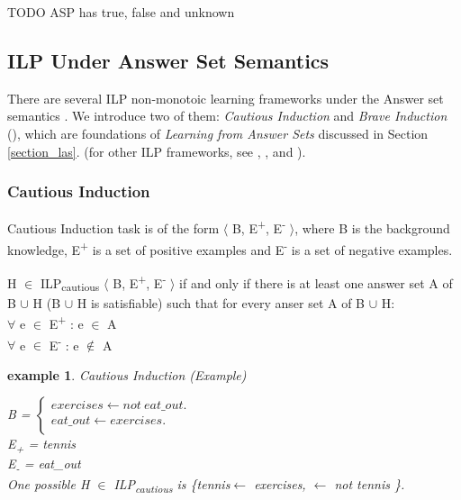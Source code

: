 \documentclass[12pt,twoside]{report}
\newtheorem{examp}{example}[section]
\begin{document}
TODO ASP has true, false and unknown

\subsection{ILP Under Answer Set Semantics}

There are several ILP non-monotoic learning frameworks under the Answer set semantics . We introduce two of them: \textit{Cautious Induction} and \textit{Brave Induction} (\cite{Sakama2009}), which are foundations of \textit{Learning from Answer Sets} discussed in Section \ref{section_las}.  (for other ILP frameworks, see \cite{Otero2001}, \cite{Inoue2014}, \cite{Corapi2012} and \cite{DeRaedt1997}).
\subsubsection{Cautious Induction}
Cautious Induction task is of the form $\langle$ B, E\textsuperscript{+}, E\textsuperscript{-} $\rangle$, where B is the background knowledge, E\textsuperscript{+} is a set of positive examples and E\textsuperscript{-} is a set of negative examples.

 H $\in$ ILP\textsubscript{cautious} $\langle$ B, E\textsuperscript{+}, E\textsuperscript{-} $\rangle$ if and only if  there is at least one answer set A of B $\cup$ H (B $\cup$ H is satisfiable) such that for every anser set A of B $\cup$ H: \\
$\forall$ e $\in$ E\textsuperscript{+} : e $\in$ A \\
$\forall$ e $\in$ E\textsuperscript{-} : e $\notin$ A \\

\begin{examp} \normalfont Cautious Induction (Example)

B = $\begin{cases}
	exercises  \leftarrow not \ eat\_out. \\
	eat\_out \leftarrow exercises. \\
      \end{cases}$ \\
E\textsubscript{+} = tennis \\
E\textsubscript{-} = eat\_out \\
One possible  H $\in$ ILP\textsubscript{cautious} is \{tennis$ \leftarrow$ exercises, $\leftarrow$ not tennis \}.
\end{examp}
\label{cautious_induction_example}
\end{document}
